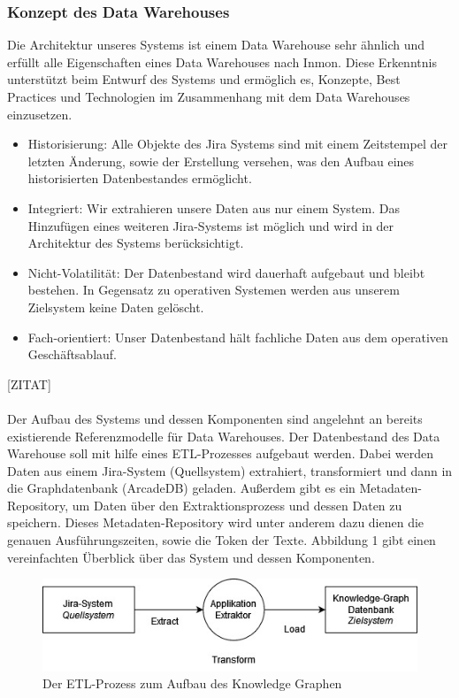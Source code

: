 \subsubsection{Konzept des Data Warehouses}
Die Architektur unseres Systems ist einem Data Warehouse sehr ähnlich und erfüllt alle Eigenschaften eines Data Warehouses nach Inmon. Diese Erkenntnis unterstützt beim Entwurf des Systems und ermöglich es, Konzepte, Best Practices und Technologien im Zusammenhang mit dem Data Warehouses einzusetzen.
\begin{itemize}
  \item Historisierung: Alle Objekte des Jira Systems sind mit einem Zeitstempel der letzten Änderung, sowie der Erstellung versehen, was den Aufbau eines historisierten Datenbestandes ermöglicht.
  \item Integriert: Wir extrahieren unsere Daten aus nur einem System. Das Hinzufügen eines weiteren Jira-Systems ist möglich und wird in der Architektur des Systems berücksichtigt.
  \item Nicht-Volatilität: Der Datenbestand wird dauerhaft aufgebaut und bleibt bestehen. In Gegensatz zu operativen Systemen werden aus unserem Zielsystem keine Daten gelöscht.
  \item Fach-orientiert: Unser Datenbestand hält fachliche Daten aus dem operativen Geschäftsablauf.
\end{itemize}
[ZITAT]\\\\
Der Aufbau des Systems und dessen Komponenten sind angelehnt an bereits existierende Referenzmodelle für Data Warehouses. Der Datenbestand des Data Warehouse soll mit hilfe eines ETL-Prozesses aufgebaut werden. Dabei werden Daten aus einem Jira-System (Quellsystem) extrahiert, transformiert und dann in die Graphdatenbank (ArcadeDB) geladen. Außerdem gibt es ein Metadaten-Repository, um Daten über den Extraktionsprozess und dessen Daten zu speichern. Dieses Metadaten-Repository wird unter anderem dazu dienen die genauen Ausführungszeiten, sowie die Token der Texte. Abbildung 1 gibt einen vereinfachten Überblick über das System und dessen Komponenten.
\begin{figure}[h]
\centering
\includegraphics[scale=.6]{dateien/ETL-Prozess.jpg}
\caption{Der ETL-Prozess zum Aufbau des Knowledge Graphen}
\label{fig:meine-grafik}
\end{figure}
